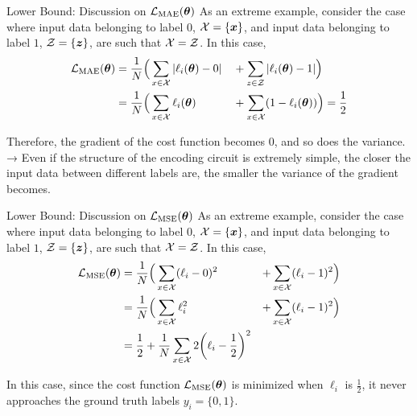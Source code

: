 \documentclass[dvipdfmx,10pt,aspectratio=169]{beamer}
\begin{document}
\begin{frame}{Lower Bound: Discussion on $\mathcal{L}_{\mathrm{MAE}}(\vb*{\theta})$}
    As an extreme example, consider the case where input data belonging to label $0$, $\mathcal{X} = \{\vb*{x}\}$, and input data belonging to label $1$, $\mathcal{Z} = \{\vb*{z}\}$, are such that $\mathcal{X} = \mathcal{Z}$.
    In this case,
    \begin{alignat*}{2}
        \mathcal{L}_{\mathrm{MAE}}(\vb*{\theta})
        &= \frac1N\Big(\sum_{x\in\mathcal{X}} |\ell_{i}(\vb*{\theta}) - 0| &&+ \sum_{z\in\mathcal{Z}} |\ell_{i}(\vb*{\theta}) - 1|\Big)\\
        &= \frac1N\Big(\sum_{x\in\mathcal{X}} \ell_{i}(\vb*{\theta})       &&+ \sum_{x\in\mathcal{X}} (1 - \ell_{i}(\vb*{\theta}))\Big) = \frac12
    \end{alignat*}
    
    Therefore, the gradient of the cost function becomes $0$, and so does the variance.\\
    → Even if the structure of the encoding circuit is extremely simple, the closer the input data between different labels are, the smaller the variance of the gradient becomes.
\end{frame}

\begin{frame}{Lower Bound: Discussion on $\mathcal{L}_{\mathrm{MSE}}(\vb*{\theta})$}
    As an extreme example, consider the case where input data belonging to label $0$, $\mathcal{X} = \{\vb*{x}\}$, and input data belonging to label $1$, $\mathcal{Z} = \{\vb*{z}\}$, are such that $\mathcal{X} = \mathcal{Z}$.
    In this case,
    \begin{alignat*}{2}
        \mathcal{L}_{\mathrm{MSE}}(\vb*{\theta})
        &= \frac1N\Big(\sum_{x\in\mathcal{X}} (\ell_{i} - 0)^2 &+ \sum_{x\in\mathcal{X}} (\ell_{i} - 1)^2\Big)\\
        &= \frac1N\Big(\sum_{x\in\mathcal{X}} \ell_{i}^2       &+ \sum_{x\in\mathcal{X}} (\ell_{i} - 1)^2\Big)\\
        &= \frac12 + \frac1N\sum_{x\in\mathcal{X}} 2\qty(\ell_i - \frac12)^2
    \end{alignat*}
    
    In this case, since the cost function $\mathcal{L}_{\mathrm{MSE}}(\vb*{\theta})$ is minimized when $\ell_i$ is $\frac12$, it never approaches the ground truth labels $y_i = \{0,1\}$.
\end{frame}
\end{document}
